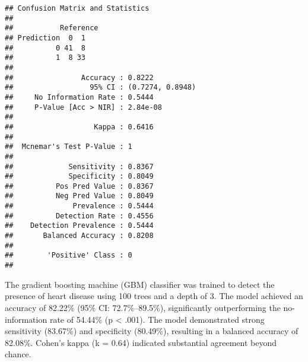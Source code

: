 \documentclass[
]{article}
\begin{document}
\begin{verbatim}
## Confusion Matrix and Statistics
## 
##           Reference
## Prediction  0  1
##          0 41  8
##          1  8 33
##                                           
##                Accuracy : 0.8222          
##                  95% CI : (0.7274, 0.8948)
##     No Information Rate : 0.5444          
##     P-Value [Acc > NIR] : 2.84e-08        
##                                           
##                   Kappa : 0.6416          
##                                           
##  Mcnemar's Test P-Value : 1               
##                                           
##             Sensitivity : 0.8367          
##             Specificity : 0.8049          
##          Pos Pred Value : 0.8367          
##          Neg Pred Value : 0.8049          
##              Prevalence : 0.5444          
##          Detection Rate : 0.4556          
##    Detection Prevalence : 0.5444          
##       Balanced Accuracy : 0.8208          
##                                           
##        'Positive' Class : 0               
## 
\end{verbatim}

The gradient boosting machine (GBM) classifier was trained to detect the
presence of heart disease using 100 trees and a depth of 3. The model
achieved an accuracy of 82.22\% (95\% CI: 72.7\%--89.5\%), significantly
outperforming the no-information rate of 54.44\% (p \textless{} .001).
The model demonstrated strong sensitivity (83.67\%) and specificity
(80.49\%), resulting in a balanced accuracy of 82.08\%. Cohen's kappa (k
= 0.64) indicated substantial agreement beyond chance.
\end{document}
